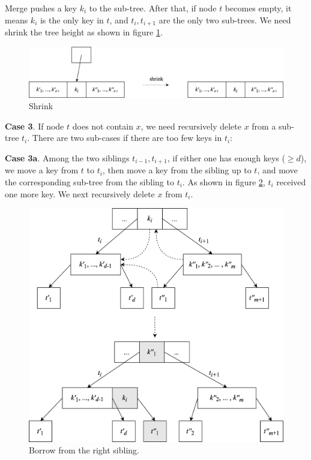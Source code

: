 \documentclass[b5paper]{article}
\begin{document}
Merge pushes a key $k_i$ to the sub-tree. After that, if node $t$ becomes empty, it means $k_i$ is the only key in $t$, and $t_i, t_{i+1}$ are the only two sub-trees. We need shrink the tree height as shown in figure \ref{fig:btree-del-shrink}.

\begin{figure}[htbp]
  \centering
  \includegraphics[scale=0.65]{img/btree-del-shrink.png}
  \caption{Shrink}
  \label{fig:btree-del-shrink}
\end{figure}

\textbf{Case 3}. If node $t$ does not contain $x$, we need recursively delete $x$ from a sub-tree $t_i$. There are two sub-cases if there are too few keys in $t_i$:

\textbf{Case 3a}. Among the two siblings $t_{i-1}, t_{i+1}$, if either one has enough keys ($\geq d$), we move a key from $t$ to $t_i$, then move a key from the sibling up to $t$, and move the corresponding sub-tree from the sibling to $t_i$. As shown in figure \ref{fig:btree-del-borrow}, $t_i$ received one more key. We next recursively delete $x$ from $t_i$.

\begin{figure}[htbp]
  \centering
  \includegraphics[scale=0.65]{img/btree-del-borrow.png}
  \caption{Borrow from the right sibling.}
  \label{fig:btree-del-borrow}
\end{figure}
\end{document}
